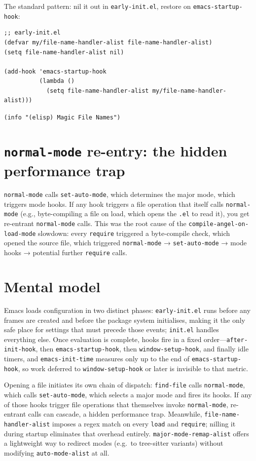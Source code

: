 The standard pattern: nil it out in \texttt{early-init.el}, restore on \texttt{emacs-startup-hook}:

\begin{verbatim}
;; early-init.el
(defvar my/file-name-handler-alist file-name-handler-alist)
(setq file-name-handler-alist nil)

(add-hook 'emacs-startup-hook
          (lambda ()
            (setq file-name-handler-alist my/file-name-handler-alist)))
\end{verbatim}

\texttt{(info "(elisp) Magic File Names")}

\section{\texttt{normal-mode} re-entry: the hidden performance trap}\label{normal-mode-re-entry-the-hidden-performance-trap}

\texttt{normal-mode} calls \texttt{set-auto-mode}, which determines the major mode, which triggers mode hooks. If any hook triggers a file operation that itself calls \texttt{normal-mode} (e.g., byte-compiling a file on load, which opens the \texttt{.el} to read it), you get re-entrant \texttt{normal-mode} calls. This was the root cause of the \texttt{compile-angel-on-load-mode} slowdown: every \texttt{require} triggered a byte-compile check, which opened the source file, which triggered \texttt{normal-mode} → \texttt{set-auto-mode} → mode hooks → potential further \texttt{require} calls.

\section{Mental model}
Emacs loads configuration in two distinct phases: \texttt{early-init.el}
runs before any frames are created and before the package system
initialises, making it the only safe place for settings that must precede
those events; \texttt{init.el} handles everything else.  Once evaluation
is complete, hooks fire in a fixed order---\texttt{after-init-hook}, then
\texttt{emacs-startup-hook}, then \texttt{window-setup-hook}, and finally
idle timers, and \texttt{emacs-init-time} measures only up to the end of
\texttt{emacs-startup-hook}, so work deferred to \texttt{window-setup-hook}
or later is invisible to that metric.

Opening a file initiates its own chain of dispatch:
\texttt{find-file} calls \texttt{normal-mode}, which calls
\texttt{set-auto-mode}, which selects a major mode and fires its hooks.
If any of those hooks trigger file operations that themselves invoke
\texttt{normal-mode}, re-entrant calls can cascade, a hidden performance
trap.  Meanwhile, \texttt{file-name-handler-alist} imposes a regex match
on every \texttt{load} and \texttt{require}; nilling it during startup
eliminates that overhead entirely.
\texttt{major-mode-remap-alist} offers a lightweight way to redirect
modes (e.g.\ to tree-sitter variants) without modifying
\texttt{auto-mode-alist} at all.

